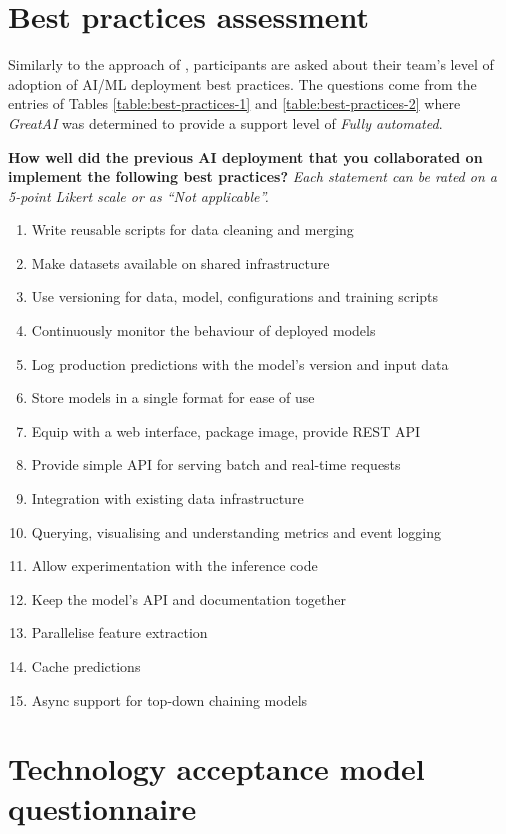 \appendix

\chapter{Best practices assessment} \label{appendix:practices}

Similarly to the approach of \cite{serban2020adoption}, participants are asked about their team's level of adoption of AI/ML deployment best practices. The questions come from the entries of Tables \ref{table:best-practices-1} and \ref{table:best-practices-2} where \textit{GreatAI} was determined to provide a support level of \textit{Fully automated}.

\textbf{How well did the previous AI deployment that you collaborated on implement the following best practices?} \textit{Each statement can be rated on a 5-point Likert scale or as ``Not applicable''.}

\begin{enumerate}
\item Write reusable scripts for data cleaning and merging
\item Make datasets available on shared infrastructure
\item Use versioning for data, model, configurations and training scripts
\item Continuously monitor the behaviour of deployed models
\item Log production predictions with the model's version and input data
\item Store models in a single format for ease of use
\item Equip with a web interface, package image, provide REST API
\item Provide simple API for serving batch and real-time requests
\item Integration with existing data infrastructure
\item Querying, visualising and understanding metrics and event logging
\item Allow experimentation with the inference code
\item Keep the model's API and documentation together
\item Parallelise feature extraction
\item Cache predictions
\item Async support for top-down chaining models
\end{enumerate}

\chapter{Technology acceptance model questionnaire} \label{appendix:questions}

